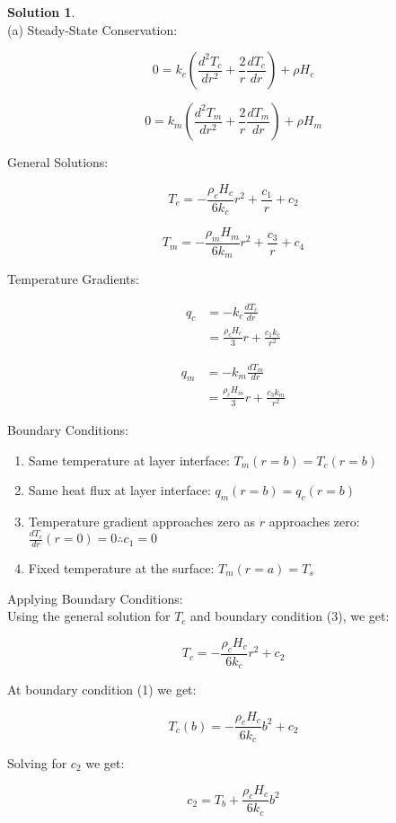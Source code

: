 \documentclass[titlepage, 11pt]{article}
\theoremstyle{definition}
\newtheorem*{solution}{Solution}
\begin{document}
\begin{solution}\ \\
\noindent
(a) 
Steady-State Conservation:

$$0 = k_c \left(\frac{d^2 T_c}{dr^2} + \frac{2}{r} \frac{dT_c}{dr}\right) + \rho H_c$$

$$0 = k_m \left(\frac{d^2 T_m}{dr^2} + \frac{2}{r} \frac{dT_m}{dr}\right) + \rho H_m$$

General Solutions:

$$T_c = -\frac{\rho_c H_c}{6k_c}r^2 + \frac{c_1}{r} + c_2$$

$$T_m = -\frac{\rho_m H_m}{6k_m}r^2 + \frac{c_3}{r} + c_4$$

Temperature Gradients:

\begin{align*}
    q_c & = -k_c \frac{dT_c}{dr}\\
    & = \frac{\rho_c H_c}{3}r + \frac{c_1 k_c}{r^2}
\end{align*}

\begin{align*}
    q_m & = -k_m \frac{dT_m}{dr}\\
    & = \frac{\rho_c H_m}{3}r + \frac{c_3 k_m}{r^2}
\end{align*}

\newpage
\noindent
Boundary Conditions:
\begin{enumerate}
    \item Same temperature at layer interface: $T_m (r=b) = T_c (r=b)$
    \item Same heat flux at layer interface: $q_m (r=b) = q_c (r=b)$
    \item Temperature gradient approaches zero as $r$ approaches zero: $\frac{dT_c}{dr}(r=0)=0 \therefore \boxed{c_1 =0}$
    \item Fixed temperature at the surface: $T_m (r=a) = T_s$
\end{enumerate}

\noindent
Applying Boundary Conditions:\\

Using the general solution for $T_c$ and boundary condition (3), we get:

$$T_c = -\frac{\rho_c H_c}{6k_c}r^2 + c_2$$

At boundary condition (1) we get:

$$T_c (b) = -\frac{\rho_c H_c}{6k_c}b^2 + c_2$$

Solving for $c_2$ we get:

$$ c_2 = T_b + \frac{\rho_c H_c}{6k_c}b^2 $$


\end{solution}
\end{document}
